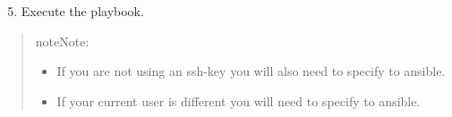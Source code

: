 \documentclass[letterpaper,10pt,english]{sphinxmanual}
\begin{document}
\begin{enumerate}
\setcounter{enumi}{4}
\item {} 
Execute the playbook.

\end{enumerate}
\begin{quote}

\begin{sphinxadmonition}{note}{Note:}\begin{itemize}
\item {} 
If you are not using an ssh-key you will also need to specify  to ansible.

\item {} 
If your current user is different you will need to specify  to ansible.

\end{itemize}
\end{sphinxadmonition}

\begin{sphinxVerbatim}[commandchars=\\\{\}]
    
\end{sphinxVerbatim}
\end{quote}
\end{document}
